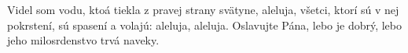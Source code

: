 Videl som vodu, ktoá tiekla z pravej strany svätyne, aleluja,
všetci, ktorí sú v nej pokrstení, sú spasení a volajú: aleluja, aleluja.
\versseparator
Oslavujte Pána, lebo je dobrý,
lebo jeho milosrdenstvo trvá naveky.